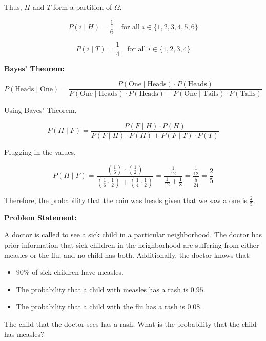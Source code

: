 \documentclass{article}
\begin{document}
    \pagebreak

    Thus, \( H \) and \( T \) form a partition of \( \Omega \).

    \[
        P(i \mid H) = \frac{1}{6} \quad \text{for all } i \in \{1, 2, 3, 4, 5, 6\}
    \]

    \[
        P(i \mid T) = \frac{1}{4} \quad \text{for all } i \in \{1, 2, 3, 4\}
    \]

    \textbf{Bayes' Theorem:}
    
    \[
        P(\text{Heads} \mid \text{One}) = \frac{P(\text{One} \mid \text{Heads}) \cdot P(\text{Heads})}{P(\text{One} \mid \text{Heads}) \cdot P(\text{Heads}) + P(\text{One} \mid \text{Tails}) \cdot P(\text{Tails})}
    \]

    Using Bayes' Theorem,

    \[
        P(H \mid F) = \frac{P(F \mid H) \cdot P(H)}{P(F \mid H) \cdot P(H) + P(F \mid T) \cdot P(T)}
    \]

    Plugging in the values,

    \[
        P(H \mid F) = \frac{\left(\frac{1}{6}\right) \cdot \left(\frac{1}{2}\right)}{\left(\frac{1}{6} \cdot \frac{1}{2}\right) + \left(\frac{1}{4} \cdot \frac{1}{2}\right)} 
        = \frac{\frac{1}{12}}{\frac{1}{12} + \frac{1}{8}} 
        = \frac{\frac{1}{12}}{\frac{5}{24}} 
        = \frac{2}{5}
    \]

    Therefore, the probability that the coin was heads given that we saw a one is \( \boxed{\frac{2}{5}} \).
    
    \textbf{Problem Statement:}
    
    A doctor is called to see a sick child in a particular neighborhood. The doctor has prior information that sick children in the neighborhood are suffering from either measles or the flu, and no child has both. Additionally, the doctor knows that:
    \begin{itemize}
        \item \(90\%\) of sick children have measles.
        \item The probability that a child with measles has a rash is \(0.95\).
        \item The probability that a child with the flu has a rash is \(0.08\).
    \end{itemize}
    
    The child that the doctor sees has a rash. What is the probability that the child has measles?
    
    \bigskip
    
\end{document}
